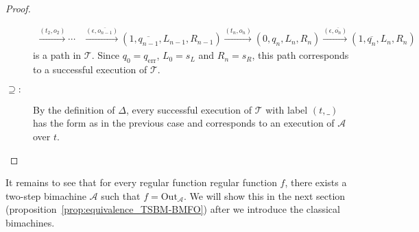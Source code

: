 \documentclass{article}
\begin{document}
\begin{proof}
\begin{description}
\begin{align*}
					\xrightarrow{(t_2, o_2)} \cdots &\xrightarrow{(\epsilon, \overline{o_{n-1}})} (1, \overline{q_{n-1}}, L_{n-1}, R_{n-1}) \xrightarrow{(t_n, o_n)} (0, q_n, L_n, R_n) \xrightarrow{(\epsilon, \overline{o_n})} (1, \overline{q_n}, L_n, R_n)
				\end{align*}
				is a path in $\mathcal{T}$. Since $q_0 = q_\mathrm{err}$, $L_0 = s_L$ and $R_n = s_R$, this path corresponds to a successful execution of $\mathcal{T}$.
			\item[$\supseteq:$]
				By the definition of $\Delta$, every successful execution of $\mathcal{T}$ with label $(t, \_)$ has the form as in the previous case and corresponds to an execution of $\mathcal{A}$ over $t$.
		\end{description}
	\end{proof}
	It remains to see that for every regular function regular function $f$, there exists a two-step bimachine $\mathcal{A}$ such that $f = \mathrm{Out}_\mathcal{A}$. We will show this in the next section (proposition~\ref{prop:equivalence_TSBM-BMFO}) after we introduce the classical bimachines.
	
\end{document}
